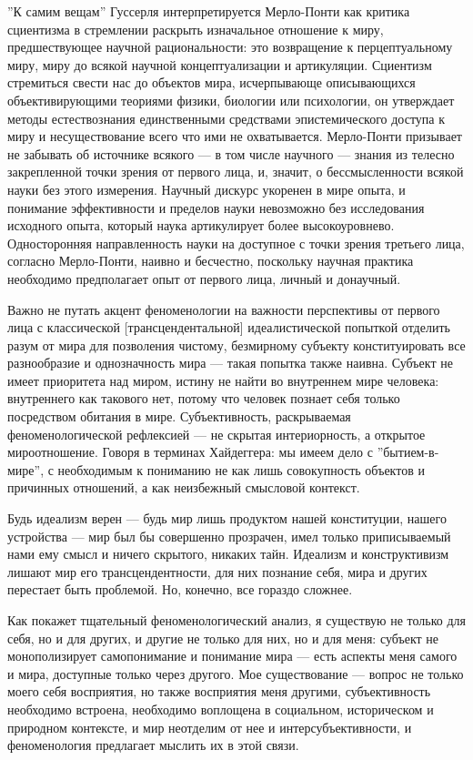 \documentclass[11pt]{book}
\begin{document}
''К самим вещам'' Гуссерля интерпретируется Мерло-Понти как критика сциентизма в стремлении раскрыть изначальное отношение к миру, предшествующее научной рациональности: это возвращение к перцептуальному миру, миру до всякой научной концептуализации и артикуляции. Сциентизм стремиться свести нас до объектов мира, исчерпывающе описывающихся объективирующими теориями физики, биологии или психологии, он утверждает методы естествознания единственными средствами эпистемического доступа к миру и несуществование всего что ими не охватывается. Мерло-Понти призывает не забывать об источнике всякого --- в том числе научного --- знания из телесно закрепленной точки зрения от первого лица, и, значит, о бессмысленности всякой науки без этого измерения. Научный дискурс укоренен в мире опыта, и понимание эффективности и пределов науки невозможно без исследования исходного опыта, который наука артикулирует более высокоуровнево. Односторонняя направленность науки на доступное с точки зрения третьего лица, согласно Мерло-Понти, наивно и бесчестно, поскольку научная практика необходимо предполагает опыт от первого лица, личный и донаучный.

Важно не путать акцент феноменологии на важности перспективы от первого лица с классической [трансцендентальной] идеалистической попыткой отделить разум от мира для позволения чистому, безмирному субъекту конституировать все разнообразие и однозначность мира --- такая попытка также наивна. Субъект не имеет приоритета над миром, истину не найти во внутреннем мире человека: внутреннего как такового нет, потому что человек познает себя только посредством обитания в мире. Субъективность, раскрываемая феноменологической рефлексией --- не скрытая интериорность, а открытое мироотношение. Говоря в терминах Хайдеггера: мы имеем дело с ''бытием-в-мире'', с необходимым к пониманию не как лишь совокупность объектов и причинных отношений, а как неизбежный смысловой контекст.

Будь идеализм верен --- будь мир лишь продуктом нашей конституции, нашего устройства --- мир был бы совершенно прозрачен, имел только приписываемый нами ему смысл и ничего скрытого, никаких тайн. Идеализм и конструктивизм лишают мир его трансцендентности, для них познание себя, мира и других перестает быть проблемой. Но, конечно, все гораздо сложнее.

Как покажет тщательный феноменологический анализ, я существую не только для себя, но и для других, и другие не только для них, но и для меня: субъект не монополизирует самопонимание и понимание мира --- есть аспекты меня самого и мира, доступные только через другого. Мое существование --- вопрос не только моего себя восприятия, но также восприятия меня другими, субъективность необходимо встроена, необходимо воплощена в социальном, историческом и природном контексте, и мир неотделим от нее и интерсубъективности, и феноменология предлагает мыслить их в этой связи.
\end{document}
